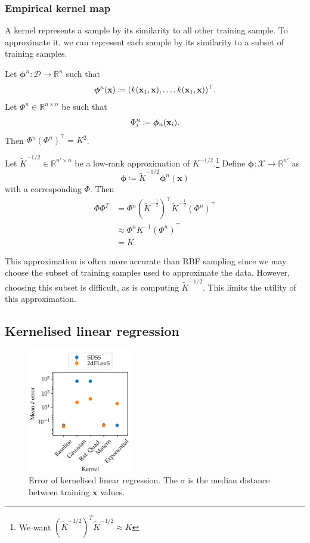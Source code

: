 \documentclass[11pt,twoside,openright]{report}
\newcommand\bphi{\bm{\phi}}
\newcommand\bbR{\mathbb{R}}
\newcommand\bx{\mathbf{x}}
\newcommand\cD{\mathcal{D}}
\newcommand\cX{\mathcal{X}}
\begin{document}
\subsubsection{Empirical kernel map}

A kernel represents a sample by its similarity to all other training sample. To approximate it, we can represent each sample by its similarity to a subset of training samples.\citep{Kernels}

Let $\bphi^n : \cD \to \bbR^n$ such that \[
  \bphi^n(\bx) \coloneqq (k(\bx_1, \bx), \dots, k(\bx_1, \bx))^\top \text.
\] Let $\Phi^n \in \bbR^{n\times n}$ be such that \[
  \Phi^n_i \coloneqq \bphi_n(\bx_i) \text.
\] Then $\Phi^n(\Phi^n)^\top = K^2$.

Let $\tilde K^{-1/2} \in \bbR^{n' \times n}$ be a low-rank approximation of $K^{-1/2}$.\footnote{We want $(\tilde K^{-1/2})^T\tilde K^{-1/2} \approx K$} Define $\bphi : \cX \to \bbR^{n'}$ as \[
    \bphi \coloneqq \tilde K^{-1/2} \bphi^n(\bx)
\] with a corresponding $\Phi$. Then \begin{align*}
    \Phi\Phi^T &= \Phi^n\left(\tilde K^{-\frac12}\right)^\top \tilde K^{-\frac12}\left(\Phi^n\right)^\top \\
    &\approx \Phi^nK^{-1}\left(\Phi^n\right)^\top \\
    &= K \text{.}
\end{align*}

This approximation is often more accurate than RBF sampling since we may choose the subset of training samples used to approximate the data. However, choosing this subset is difficult, as is computing $\tilde K^{-1/2}$. This limits the utility of this approximation.

\subsection{Kernelised linear regression}

  \begin{figure}
    \centering
    \includegraphics[width=0.4\textwidth]{linreg_kernelised.pdf}
    \caption{Error of kernelised linear regression. The $\sigma$ is the median distance between training $\bx$ values.}
    \label{fig:linreg_kernelised}
  \end{figure}
\end{document}
